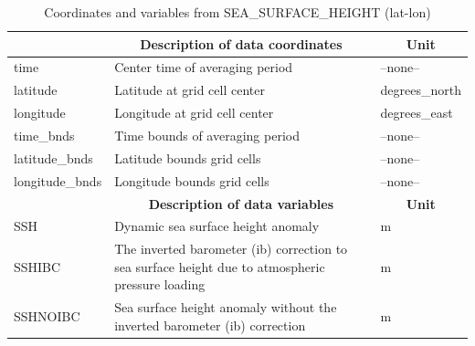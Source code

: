 \begin{longtable}{|m{}|m{}|m{}|}
\caption{Coordinates and variables from SEA\_SURFACE\_HEIGHT (lat-lon)}
\label{tab:table-<xarray.Dataset> Size: 3MB
Dimensions:         (time: 1, latitude: 360, longitude: 720, nv: 2)
Coordinates:
  * time            (time) datetime64[ns] 8B 2017-12-29T12:00:00
  * latitude        (latitude) float32 1kB -89.75 -89.25 -88.75 ... 89.25 89.75
  * longitude       (longitude) float32 3kB -179.8 -179.2 -178.8 ... 179.2 179.8
    time_bnds       (time, nv) datetime64[ns] 16B ...
    latitude_bnds   (latitude, nv) float32 3kB ...
    longitude_bnds  (longitude, nv) float32 6kB ...
Dimensions without coordinates: nv
Data variables:
    SSH             (time, latitude, longitude) float32 1MB ...
    SSHIBC          (time, latitude, longitude) float32 1MB ...
    SSHNOIBC        (time, latitude, longitude) float32 1MB ...
Attributes: (12/57)
    acknowledgement:              This research was carried out by the Jet Pr...
    author:                       Ian Fenty and Ou Wang
    cdm_data_type:                Grid
    comment:                      Fields provided on a regular lat-lon grid. ...
    Conventions:                  CF-1.8, ACDD-1.3
    coordinates_comment:          Note: the global 'coordinates' attribute de...
    ...                           ...
    time_coverage_duration:       P1D
    time_coverage_end:            2017-12-30T00:00:00
    time_coverage_resolution:     P1D
    time_coverage_start:          2017-12-29T00:00:00
    title:                        ECCO Sea Surface Height - Daily Mean 0.5 De...
    uuid:                         7beb77e0-404a-11eb-8bf7-0cc47a3f891b-fields} \\ 
\hline \endfirsthead \endhead \endfoot \hline \endlastfoot
\rowcolor{lightgray} \multicolumn{1}{|c|}{\textbf{Coordinates}} & \multicolumn{1}{|c|}{\textbf{Description of data coordinates}} & \multicolumn{1}{|c|}{\textbf{Unit}}\\ \hline
time &Center time of averaging period &--none--  \\ \hline
latitude &Latitude at grid cell center &degrees\_north  \\ \hline
longitude &Longitude at grid cell center &degrees\_east  \\ \hline
time\_bnds &Time bounds of averaging period &--none--  \\ \hline
latitude\_bnds &Latitude bounds grid cells &--none--  \\ \hline
longitude\_bnds &Longitude bounds grid cells &--none--  \\ \hline
\rowcolor{lightgray} \multicolumn{1}{|c|}{\textbf{Variables}} & \multicolumn{1}{|c|}{\textbf{Description of data variables}} & \multicolumn{1}{|c|}{\textbf{Unit}}\\ \hline
SSH &Dynamic sea surface height anomaly &m  \\ \hline
SSHIBC &The inverted barometer (ib) correction to sea surface height due to atmospheric pressure loading &m  \\ \hline
SSHNOIBC &Sea surface height anomaly without the inverted barometer (ib) correction &m  \\ \hline
\end{longtable}

